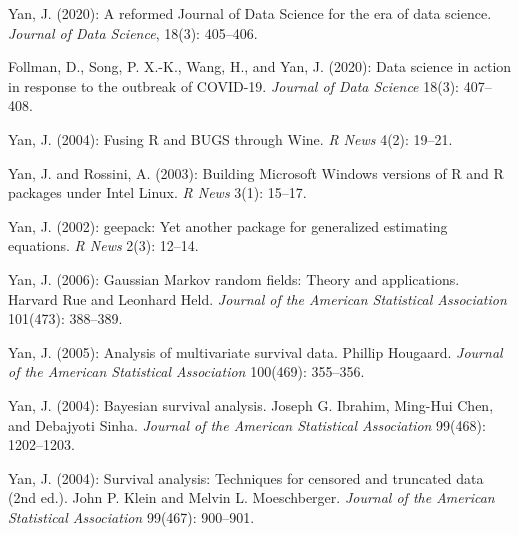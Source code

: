 \documentclass[Statistics]{vita}
\begin{document}
\begin{vita}
\begin{Publications}
\begin{Software}
  \end{Software}
  \begin{NonRefereedPublications}
  \item Yan, J. (2020): A reformed Journal of Data Science for the era of data science. {\em Journal of Data Science\/}, 18(3): 405--406.
  \item Follman, D., Song, P. X.-K., Wang, H., and Yan, J. (2020): Data science in action in response to the outbreak of COVID-19. {\em Journal of Data Science\/} 18(3): 407--408.
  \item Yan, J. (2004): Fusing {R} and {BUGS} through {Wine}. {\em R News\/} 4(2): 19--21.
  \item Yan, J. and Rossini, A. (2003): Building {M}icrosoft {W}indows versions of {R} and {R} packages under {I}ntel {L}inux. {\em R News\/} 3(1): 15--17.
  \item Yan, J. (2002): geepack: Yet another package for generalized estimating equations. {\em R News\/} 2(3): 12--14.
  \end{NonRefereedPublications}
  \begin{BookReviews}
  \item Yan, J. (2006): Gaussian Markov random fields: Theory and applications. {H}arvard {R}ue and {L}eonhard {H}eld. {\em Journal of the American Statistical Association\/} 101(473): 388--389.
  \item Yan, J. (2005): Analysis of multivariate survival data. {P}hillip {H}ougaard. {\em Journal of the American Statistical Association\/} 100(469): 355--356.
  \item Yan, J. (2004): Bayesian survival analysis. {J}oseph {G}. {I}brahim, {M}ing-{H}ui {C}hen, and {D}ebajyoti {S}inha. {\em Journal of the American Statistical Association\/} 99(468): 1202--1203.
  \item Yan, J. (2004): Survival analysis: Techniques for censored and truncated data (2nd ed.). {J}ohn {P}. {K}lein and {M}elvin {L}. {M}oeschberger. {\em Journal of the American Statistical Association\/} 99(467): 900--901.
  \end{BookReviews}
  \end{Publications}
  \begin{InvitedTalks}

\end{InvitedTalks}
\end{vita}
\end{document}
